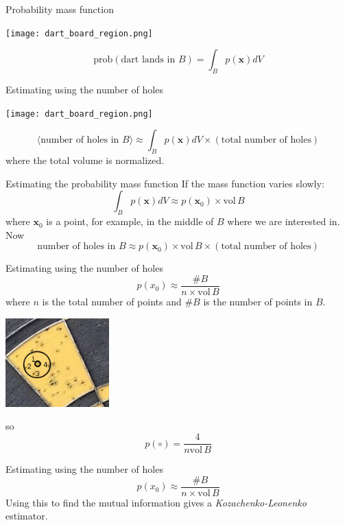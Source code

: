\documentclass{beamer}
\begin{document}
\begin{frame}{Probability mass function}
\begin{center}
\texttt{[image: dart\_board\_region.png]}
\end{center}
\color{dark}
$$\mbox{prob}(\mbox{dart lands in }B)=\int_B p(\mathbf{x})dV$$
\color{black}
\end{frame}


\begin{frame}{Estimating using the number of holes}
\color{reddish}
\begin{center}
\texttt{[image: dart\_board\_region.png]}
\end{center}
\color{dark}
$$\langle \mbox{number of holes in }B\rangle \approx \int_B p(\mathbf{x})dV \times (\mbox{total number of holes})$$
\color{black}
where the total volume is normalized.
\end{frame}

\begin{frame}{Estimating the probability mass function}
\color{black}
If the mass function varies slowly:
\color{dark}
$$\int_B p(\mathbf{x})dV\approx p(\mathbf{x}_0) \times \mbox{vol}\,B$$
\color{black}
where $\textbf{x}_0$ is a point, for example, in the middle of $B$ where we are interested in. Now
\color{dark}
$$\mbox{number of holes in }B \approx p(\mathbf{x}_0) \times \mbox{vol}\,B \times (\mbox{total number of holes})$$
\color{black}
\end{frame}


\begin{frame}{Estimating using the number of holes}
\color{dark}
$$p(x_0)\approx\frac{\#B}{n\times \mbox{vol}\,B}
$$
\color{black}
where $n$ is the total number of points and $\#B$ is the number of points in $B$.
\color{reddish}
\begin{center}
\includegraphics[width=4cm]{dart_board_zoom_ball.png}
\end{center}
\color{dark}
so 
$$p(\circ)=\frac{4}{n\mbox{vol}\,B}$$
\end{frame}


\begin{frame}{Estimating using the number of holes}
\color{dark}
$$p(x_0)\approx\frac{\#B}{n\times \mbox{vol}\,B}$$
\color{black}
Using this to find the mutual information gives a \textsl{Kozachenko-Leonenko} estimator.
\end{frame}
\end{document}
